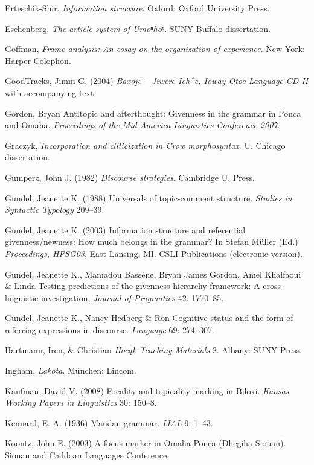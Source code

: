 \documentclass[output=paper]{LSP/langsci}
\begin{document}
\begin{reflist}
Erteschik-Shir, \citet{Nomi2007} \emph{Information structure}. Oxford: Oxford University Press.

Eschenberg, \citet{Ardis2005} \emph{The article system of Umoⁿhoⁿ}. SUNY Buffalo dissertation.

Goffman, \citet{Erving1974} \emph{Frame analysis: An essay on the organization of experience}. New York: Harper Colophon.

GoodTracks, Jimm G. (2004) \emph{Baxoje -- Jiwere Ich\^{}e, Ioway Otoe Language CD II} with accompanying text.

Gordon, Bryan \citet{James2008} Antitopic and afterthought: Givenness in the grammar in Ponca and Omaha. \emph{Proceedings of the Mid-America Linguistics Conference 2007}.

Graczyk, \citet{Randolph1991} \emph{Incorporation and cliticization in Crow morphosyntax}. U. Chicago dissertation.

Gumperz, John J. (1982) \emph{Discourse strategies}. Cambridge U. Press.

Gundel, Jeanette K. (1988) Universals of topic-comment structure. \emph{Studies in Syntactic Typology} 209--39.

Gundel, Jeanette K. (2003) Information structure and referential givenness/newness: How much belongs in the grammar? In Stefan Müller (Ed.) \emph{Proceedings, HPSG03}, East Lansing, MI. CSLI Publications (electronic version).

Gundel, Jeanette K., Mamadou Bassène, Bryan James Gordon, Amel Khalfaoui \& Linda \citet{Humnick2010} Testing predictions of the givenness hierarchy framework: A cross-linguistic investigation. \emph{Journal of Pragmatics} 42: 1770--85.

Gundel, Jeanette K., Nancy Hedberg \& Ron \citet{Zacharski1993} Cognitive status and the form of referring expressions in discourse. \emph{Language} 69: 274--307.

Hartmann, Iren, \& Christian \citet{Marschke2010} \emph{Hocąk Teaching Materials} 2. Albany: SUNY Press.

Ingham, \citet{Bruce2003} \emph{Lakota}. München: Lincom.

Kaufman, David V. (2008) Focality and topicality marking in Biloxi. \emph{Kansas Working Papers in Linguistics} 30: 150--8.

Kennard, E. A. (1936) Mandan grammar. \emph{IJAL} 9: 1--43.

Koontz, John E. (2003) A focus marker in Omaha-Ponca (Dhegiha Siouan). Siouan and Caddoan Languages Conference.


\end{reflist}
\end{document}
